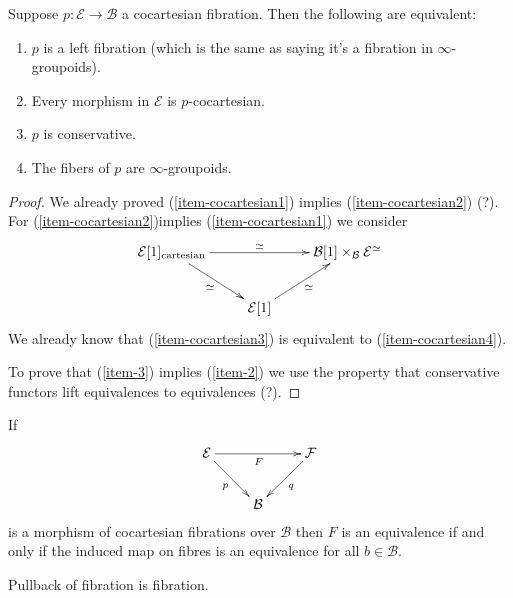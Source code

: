 \begin{lemma}
\label{lemma-cocartesian-fibration-equivalences}
Suppose $p:\mathcal{E} \to \mathcal{B}$ a cocartesian fibration.
Then the following are equivalent:
\begin{enumerate}
\item $p$ is a left fibration (which is the same as saying it's
a fibration in $\infty$-groupoids).
\label{item-cocartesian1}

\item Every morphism in $\mathcal{E}$ is $p$-cocartesian.
\label{item-cocartesian2}

\item $p$ is conservative.
\label{item-cocartesian3}

\item The fibers of $p$ are $\infty$-groupoids.
\label{item-cocartesian4}
\end{enumerate}
\end{lemma}

\begin{proof}
We already proved (\ref{item-cocartesian1}) implies (\ref{item-cocartesian2})
(?). For (\ref{item-cocartesian2})implies (\ref{item-cocartesian1}) we consider
$$
\xymatrix{
\mathcal{E}[1]_{\text{cartesian}} \ar[rd]_{\simeq} \ar[rr]^{\simeq} && 
\mathcal{B}[1]\times_{\mathcal{B}}\mathcal{E}^{\simeq} \\
& \mathcal{E}[1]\ar[ur]_{\simeq}
}
$$
We already know that (\ref{item-cocartesian3}) is equivalent to
(\ref{item-cocartesian4}).

To prove that (\ref{item-3}) implies (\ref{item-2})
we use the property that conservative functors
lift equivalences to equivalences (?).


\end{proof}

\begin{proposition}
\label{proposition-mophisms-of-cocartesian-fibrations-
equivalence-iff-equivalence-of-fibres}
If
$$
\xymatrix{
\mathcal{E} \ar[rd]_{p} \ar[rr]_{F} && \mathcal{F} \ar[dl]^{q} \\
& \mathcal{B}
}
$$
is a morphism of cocartesian fibrations over $\mathcal{B}$ 
then $F$ is an equivalence if and only if the induced
map on fibres is an equivalence for all $b \in \mathcal{B}$.
\end{proposition}

\begin{proposition}
\label{proposition-3.5.15}
Pullback of fibration is fibration.
\end{proposition}

